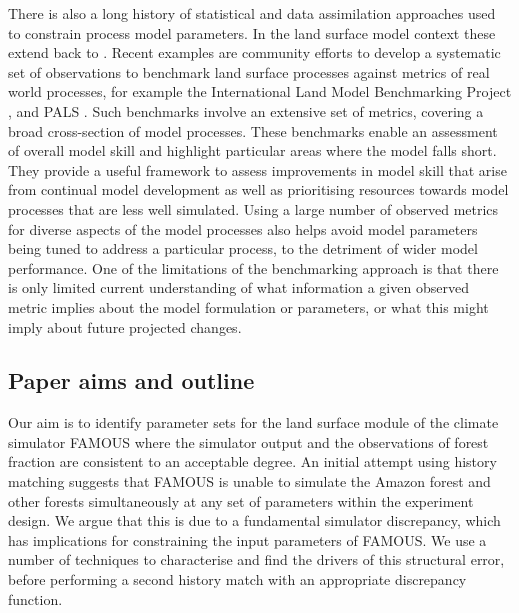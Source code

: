 \documentclass[esd, article]{copernicus} %
\begin{document}
There is also a long history of statistical and data assimilation approaches used to constrain process model parameters. In the land surface model context these extend back to \cite{sellers1996revised}. Recent examples are community efforts to develop a systematic set of observations to benchmark land surface processes against metrics of real world processes, for example the International Land Model Benchmarking Project \citep{luo2012framework}, and PALS \citep{abramowitz2012benchmarking}.  Such benchmarks involve an extensive set of metrics, covering a broad cross-section of model processes.  These benchmarks enable an assessment of overall model skill and highlight particular areas where the model falls short. They provide a useful framework to assess improvements in model skill that arise from continual model development as well as prioritising resources towards model processes that are less well simulated.  Using a large number of observed metrics for diverse aspects of the model processes also helps avoid model parameters being tuned to address a particular process, to the detriment of wider model performance. One of the limitations of the benchmarking approach is that there is only limited current understanding of what information a given observed metric implies about the model formulation or parameters, or what this might imply about future projected changes.

\subsection{Paper aims and outline}

Our aim is to identify parameter sets for the land surface module of the climate simulator FAMOUS where the simulator output and the observations of forest fraction are consistent to an acceptable degree.  An initial attempt using history matching suggests that FAMOUS is unable to simulate the Amazon forest and other forests simultaneously at any set of parameters within the experiment design. We argue that this is due to a fundamental simulator discrepancy, which has implications for constraining the input parameters of FAMOUS. We use a number of techniques to characterise and find the drivers of this structural error, before performing a second history match with an appropriate discrepancy function.
\end{document}
